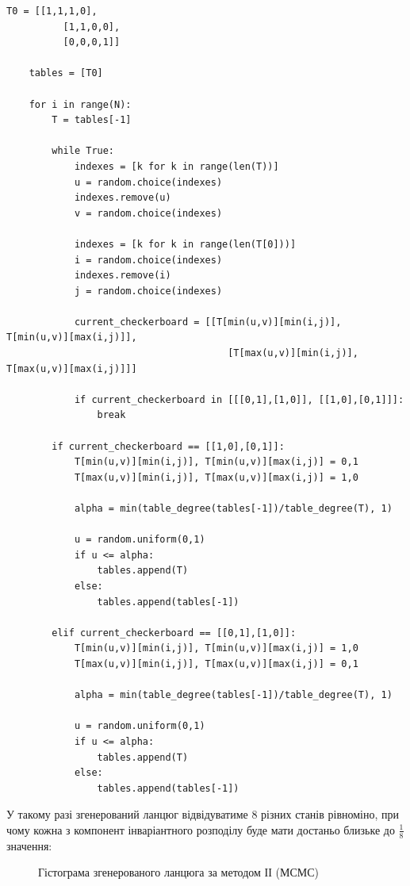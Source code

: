 \documentclass[a4paper,14pt]{extarticle} %
\numberwithin{equation}{section}
\begin{document}
\begin{lstlisting}[firstnumber=1, label = code: task 8.2, caption = Генерування ланцюга Маркова методом ІІ (МСМС)]
    T0 = [[1,1,1,0],
          [1,1,0,0],
          [0,0,0,1]]

    tables = [T0]
    
    for i in range(N):
        T = tables[-1]

        while True:
            indexes = [k for k in range(len(T))]
            u = random.choice(indexes)
            indexes.remove(u)
            v = random.choice(indexes)

            indexes = [k for k in range(len(T[0]))]
            i = random.choice(indexes)
            indexes.remove(i)
            j = random.choice(indexes)

            current_checkerboard = [[T[min(u,v)][min(i,j)], T[min(u,v)][max(i,j)]],
                                       [T[max(u,v)][min(i,j)], T[max(u,v)][max(i,j)]]]

            if current_checkerboard in [[[0,1],[1,0]], [[1,0],[0,1]]]:
                break

        if current_checkerboard == [[1,0],[0,1]]:
            T[min(u,v)][min(i,j)], T[min(u,v)][max(i,j)] = 0,1
            T[max(u,v)][min(i,j)], T[max(u,v)][max(i,j)] = 1,0

            alpha = min(table_degree(tables[-1])/table_degree(T), 1)

            u = random.uniform(0,1)
            if u <= alpha:
                tables.append(T)
            else:
                tables.append(tables[-1])

        elif current_checkerboard == [[0,1],[1,0]]:
            T[min(u,v)][min(i,j)], T[min(u,v)][max(i,j)] = 1,0
            T[max(u,v)][min(i,j)], T[max(u,v)][max(i,j)] = 0,1
            
            alpha = min(table_degree(tables[-1])/table_degree(T), 1)

            u = random.uniform(0,1)
            if u <= alpha:
                tables.append(T)
            else:
                tables.append(tables[-1])

\end{lstlisting}

\vspace{0.4cm}
У такому разі згенерований ланцюг відвідуватиме 8 різних станів рівноміно, при чому кожна з компонент інваріантного розподілу буде мати достаньо близьке до $\frac{1}{8}$ значення:

\begin{figure}[H]
    \caption{Гістограма згенерованого ланцюга за методом ІІ (МСМС)}
    \label{figure: task 8.2}
\end{figure}
\end{document}

